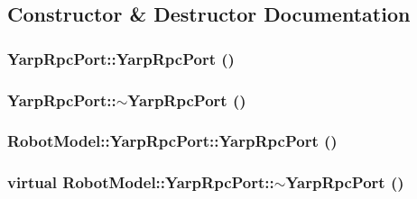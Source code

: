 \subsection{Constructor \& Destructor Documentation}
\hypertarget{class_robot_model_1_1_yarp_rpc_port_a393b44f37d77b25d8c5cb7f14609c4d5}{
\subsubsection[{YarpRpcPort}]{\setlength{\rightskip}{0pt plus 5cm}YarpRpcPort::YarpRpcPort ()}}
\label{class_robot_model_1_1_yarp_rpc_port_a393b44f37d77b25d8c5cb7f14609c4d5}
\hypertarget{class_robot_model_1_1_yarp_rpc_port_acf21bbb8e38b69fd9c3769a2f9b45743}{
\subsubsection[{$\sim$YarpRpcPort}]{\setlength{\rightskip}{0pt plus 5cm}YarpRpcPort::$\sim$YarpRpcPort ()}}
\label{class_robot_model_1_1_yarp_rpc_port_acf21bbb8e38b69fd9c3769a2f9b45743}
\hypertarget{class_robot_model_1_1_yarp_rpc_port_a056dd5174b17abd2a530eb9c77c1badb}{
\subsubsection[{YarpRpcPort}]{\setlength{\rightskip}{0pt plus 5cm}RobotModel::YarpRpcPort::YarpRpcPort ()}}
\label{class_robot_model_1_1_yarp_rpc_port_a056dd5174b17abd2a530eb9c77c1badb}
\hypertarget{class_robot_model_1_1_yarp_rpc_port_acc982a6fdf62ef56ff39bd4ca56375cd}{
\subsubsection[{$\sim$YarpRpcPort}]{\setlength{\rightskip}{0pt plus 5cm}virtual RobotModel::YarpRpcPort::$\sim$YarpRpcPort ()}}
\label{class_robot_model_1_1_yarp_rpc_port_acc982a6fdf62ef56ff39bd4ca56375cd}


